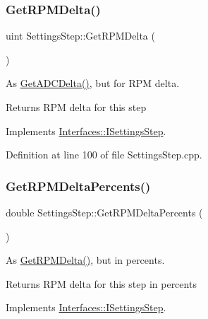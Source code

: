 \subsubsection{\texorpdfstring{Get\+R\+P\+M\+Delta()}{GetRPMDelta()}}
{\footnotesize\ttfamily uint Settings\+Step\+::\+Get\+R\+P\+M\+Delta (\begin{DoxyParamCaption}{ }\end{DoxyParamCaption})\hspace{0.3cm}{\ttfamily [virtual]}}



As \hyperlink{class_settings_step_aee30aaa97692d6b546e9dd002900f52e}{Get\+A\+D\+C\+Delta()}, but for R\+PM delta. 

\begin{DoxyReturn}{Returns}
R\+PM delta for this step 
\end{DoxyReturn}


Implements \hyperlink{class_interfaces_1_1_i_settings_step_ace758dafae2a6bcbb0b1a3a64c802e3c}{Interfaces\+::\+I\+Settings\+Step}.



Definition at line 100 of file Settings\+Step.\+cpp.

\mbox{\label{class_settings_step_ada359fe4bfdaf271e621ec2943c0644c}} 
\subsubsection{\texorpdfstring{Get\+R\+P\+M\+Delta\+Percents()}{GetRPMDeltaPercents()}}
{\footnotesize\ttfamily double Settings\+Step\+::\+Get\+R\+P\+M\+Delta\+Percents (\begin{DoxyParamCaption}{ }\end{DoxyParamCaption})\hspace{0.3cm}{\ttfamily [virtual]}}



As \hyperlink{class_settings_step_a594ce71fb0626c79c3e4d4f988e484af}{Get\+R\+P\+M\+Delta()}, but in percents. 

\begin{DoxyReturn}{Returns}
R\+PM delta for this step in percents 
\end{DoxyReturn}


Implements \hyperlink{class_interfaces_1_1_i_settings_step_a9db8c7569c5dc35b8541dc6e4d202df1}{Interfaces\+::\+I\+Settings\+Step}.




